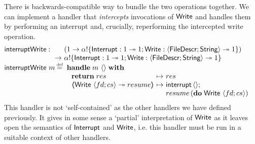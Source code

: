 \documentclass[12pt,phd,lfcs,twoside,openright,logo,leftchapter,normalheadings]{infthesis}
\theoremstyle{plain}
\theoremstyle{definition}
\begin{document}
There is backwards-compatible way to bundle the two operations
together. We can implement a handler that \emph{intercepts}
invocations of $\mathsf{Write}$ and handles them by performing an interrupt
and, crucially, reperforming the intercepted write operation.
%
\[
  \bl
  \dec{interruptWrite} :
    \ba[t]{@{~}l@{~}l}
       &(\UnitType \to \alpha \eff \{\Interrupt : \UnitType \opto \UnitType;\Write : \Record{\UFD;\String} \opto \UnitType\})\\
    \to& \alpha \eff \{\Interrupt : \UnitType \opto \UnitType;\Write : \Record{\UFD;\String} \opto \UnitType\}
    \ea\\
  \dec{interruptWrite}~m \defas
    \ba[t]{@{~}l}
      \Handle\;m~\Unit\;\With\\
        ~\ba{@{~}l@{~}c@{~}l}
           \Return\;res &\mapsto& res\\
           \OpCase{\Write}{\Record{fd;cs}}{resume} &\mapsto&
              \ba[t]{@{}l}
                \interrupt\,\Unit;\\
                resume\,(\Do\;\Write~\Record{fd;cs})
              \ea
         \ea
    \ea
  \el
\]
%
This handler is not `self-contained' as the other handlers we have
defined previously. It gives in some sense a `partial' interpretation
of $\mathsf{Write}$ as it leaves open the semantics of $\mathsf{Interrupt}$ and
$\mathsf{Write}$, i.e. this handler must be run in a suitable context of other
handlers.
\end{document}
